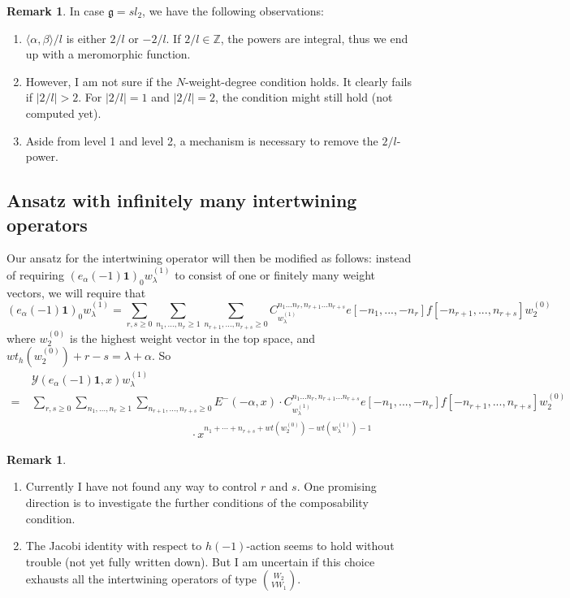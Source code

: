 \documentclass{article}
\theoremstyle{definition}
\newtheorem{rema}[theorem]{Remark}
\newcommand{\Z}{{\mathbb Z}}
\newcommand{\g}{{\mathfrak g}}
\newcommand{\Y}{{\mathcal Y}}
\newcommand{\one}{\mathbf{1}}
\begin{document}
\begin{rema}
    In case $\g=sl_2$, we have the following observations:
    \begin{enumerate}
        \item $\langle \alpha, \beta\rangle / l$ is either $2/l$ or $-2/l$. If $2/l\in \Z$, the powers are integral, thus we end up with a meromorphic function. 
        \item However, I am not sure if the $N$-weight-degree condition holds. It clearly fails if $|2/l|>2$. For $|2/l|=1$ and $|2/l|=2$, the condition might still hold (not computed yet). 
        \item Aside from level 1 and level 2, a mechanism is necessary to remove the $2/l$-power. 
    \end{enumerate}
\end{rema}

\subsection{Ansatz with infinitely many intertwining operators}

Our ansatz for the intertwining operator will then be modified as follows: instead of requiring $(e_\alpha(-1)\one)_0 w_\lambda^{(1)}$ to consist of one or finitely many weight vectors, we will require that 
$$(e_\alpha(-1)\one)_0 w_\lambda^{(1)} = \sum_{r, s\geq 0}\sum_{n_1, ..., n_r \geq 1}\sum_{n_{r+1}, ..., n_{r+s} \geq 0}C_{w_\lambda^{(1)}}^{n_1...n_r, n_{r+1}...n_{r+s}}e[-n_1, ..., -n_r]f[-n_{r+1}, ..., n_{r+s}]w_2^{(0)}$$
where $w_2^{(0)}$ is the highest weight vector in the top space, and $wt_h(w_2^{(0)})+r-s = \lambda + \alpha$. 
So 
\begin{align*}
    & \Y(e_\alpha(-1)\one, x)w_\lambda^{(1)} \\
    = \ & \sum_{r, s\geq 0}\sum_{n_1, ..., n_r \geq 1}\sum_{n_{r+1}, ..., n_{r+s} \geq 0} E^-(-\alpha, x) \cdot C_{w_\lambda^{(1)}}^{n_1...n_r, n_{r+1}...n_{r+s}}e[-n_1, ..., -n_r]f[-n_{r+1}, ..., n_{r+s}]w_2^{(0)}\\
    & \qquad \qquad \qquad \qquad \qquad \qquad \qquad \cdot x^{n_1+\cdots +n_{r+s}+wt(w_2^{(0)})-wt(w_\lambda^{(1)})-1}
\end{align*}
\begin{rema}
    \begin{enumerate}
        \item Currently I have not found any way to control $r$ and $s$. One promising direction is to investigate the further conditions of the composability condition. 
        \item  The Jacobi identity with respect to $h(-1)$-action seems to hold without trouble (not yet fully written down). But I am uncertain if this choice exhausts all the intertwining operators of type $\binom{W_2}{VW_1}$. 
    \end{enumerate}
\end{rema}
\end{document}

